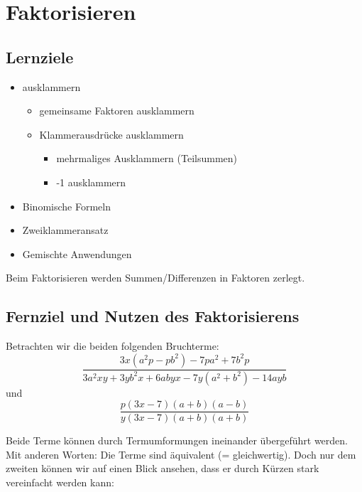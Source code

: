 \newpage
\section{Faktorisieren}

\subsection*{Lernziele}

\begin{itemize}
\item ausklammern
 \begin{itemize}
  \item gemeinsame Faktoren ausklammern
  \item Klammerausdrücke ausklammern
   \begin{itemize}
   \item mehrmaliges Ausklammern (Teilsummen)
  \item -1 ausklammern
  \end{itemize}
\end{itemize}
\item Binomische Formeln
\item Zweiklammeransatz
\item Gemischte Anwendungen
\end{itemize}


\newpage


Beim Faktorisieren werden Summen/Differenzen in Faktoren
zerlegt.


\subsection*{Fernziel und Nutzen des Faktorisierens}
Betrachten wir die beiden folgenden Bruchterme:
 $$\frac{3x(a^2p - pb^2) - 7pa^2 + 7b^2p}{3a^2xy  + 3yb^2x + 6abyx - 7y(a^2 +b^2) - 14ayb }$$
und
$$\frac{p(3x-7)(a+b)(a-b)}{y(3x-7)(a+b)(a+b)}$$

Beide Terme können durch Termumformungen ineinander übergeführt
werden. Mit anderen Worten: Die Terme sind äquivalent (= gleichwertig). Doch nur dem zweiten können wir auf einen Blick ansehen, dass er durch Kürzen stark vereinfacht werden kann:

